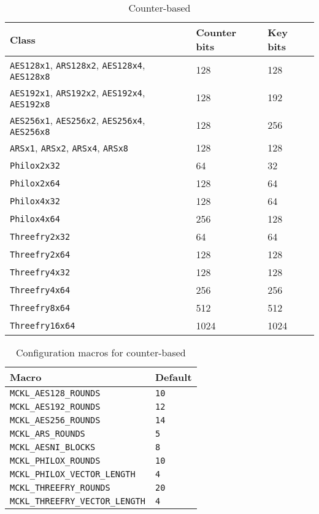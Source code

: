 \begin{table}
  \tbfigures
  \begin{tabularx}{\textwidth}{p{3in}LL}
    \toprule
    Class & Counter bits & Key bits \\
    \midrule
    \verb|AES128x1|, \verb|ARS128x2|, \verb|AES128x4|, \verb|AES128x8|
    & 128 & 128 \\
    \verb|AES192x1|, \verb|ARS192x2|, \verb|AES192x4|, \verb|AES192x8|
    & 128 & 192 \\
    \verb|AES256x1|, \verb|AES256x2|, \verb|AES256x4|, \verb|AES256x8|
    & 128 & 256 \\
    \verb|ARSx1|, \verb|ARSx2|, \verb|ARSx4|, \verb|ARSx8| & 128 & 128 \\
    \verb|Philox2x32|    & 64   & 32   \\
    \verb|Philox2x64|    & 128  & 64   \\
    \verb|Philox4x32|    & 128  & 64   \\
    \verb|Philox4x64|    & 256  & 128  \\
    \verb|Threefry2x32|  & 64   & 64   \\
    \verb|Threefry2x64|  & 128  & 128  \\
    \verb|Threefry4x32|  & 128  & 128  \\
    \verb|Threefry4x64|  & 256  & 256  \\
    \verb|Threefry8x64|  & 512  & 512  \\
    \verb|Threefry16x64| & 1024 & 1024 \\
    \bottomrule
  \end{tabularx}
  \caption{Counter-based \protect\rng}
  \label{tab:Counter-based RNG}
\end{table}

\begin{table}
  \begin{tabularx}{\textwidth}{LL}
    \toprule
    Macro & Default \\
    \midrule
    \verb|MCKL_AES128_ROUNDS|          & \verb|10| \\
    \verb|MCKL_AES192_ROUNDS|          & \verb|12| \\
    \verb|MCKL_AES256_ROUNDS|          & \verb|14| \\
    \verb|MCKL_ARS_ROUNDS|             & \verb|5|  \\
    \verb|MCKL_AESNI_BLOCKS|           & \verb|8|  \\
    \verb|MCKL_PHILOX_ROUNDS|          & \verb|10| \\
    \verb|MCKL_PHILOX_VECTOR_LENGTH|   & \verb|4|  \\
    \verb|MCKL_THREEFRY_ROUNDS|        & \verb|20| \\
    \verb|MCKL_THREEFRY_VECTOR_LENGTH| & \verb|4|  \\
    \bottomrule
  \end{tabularx}
  \caption{Configuration macros for counter-based \protect\rng}
  \label{tab:Configuration macros for counter-based RNG}
\end{table}

